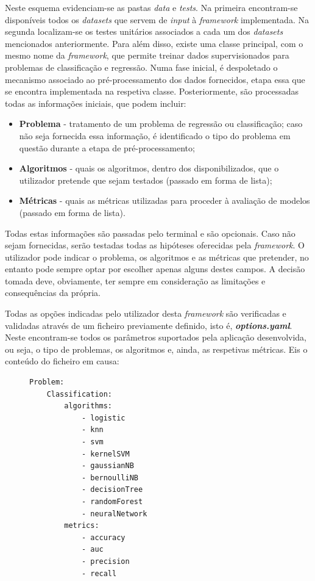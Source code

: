 \documentclass[a4paper]{report}
\begin{document}
{	Neste esquema evidenciam-se as pastas \textsl{data} e \textsl{tests}.
	Na primeira encontram-se disponíveis todos os \textit{datasets} que servem de \textit{input} à \textit{framework} implementada.
	Na segunda localizam-se os testes unitários associados a cada um dos \textit{datasets} mencionados anteriormente.
	Para além disso, existe uma classe principal, com o mesmo nome da \textit{framework}, que permite treinar dados supervisionados para problemas de classificação e regressão.
	Numa fase inicial, é despoletado o mecanismo associado ao pré-processamento dos dados fornecidos, etapa essa que se encontra implementada na respetiva classe.
	Posteriormente, são processadas todas as informações iniciais, que podem incluir:
	\begin{itemize}
		\item \textbf{Problema} - tratamento de um problema de regressão ou classificação; caso não seja fornecida essa informação, é identificado o tipo do problema em questão durante a etapa de pré-processamento;
		\item \textbf{Algoritmos} - quais os algoritmos, dentro dos disponibilizados, que o utilizador pretende que sejam testados (passado em forma de lista);
		\item \textbf{Métricas} - quais as métricas utilizadas para proceder à avaliação de modelos (passado em forma de lista).
	\end{itemize}

	Todas estas informações são passadas pelo terminal e são opcionais. Caso não sejam fornecidas, serão testadas todas as hipóteses oferecidas pela \textit{framework}.
    O utilizador pode indicar o problema, os algoritmos e as métricas que pretender, no entanto pode sempre optar por escolher apenas alguns destes campos.
    A decisão tomada deve, obviamente, ter sempre em consideração as limitações e consequências da própria.
    
    Todas as opções indicadas pelo utilizador desta \textit{framework} são verificadas e validadas através de um ficheiro previamente definido, isto é, \textbf{\textsl{options.yaml}}.
	Neste encontram-se todos os parâmetros suportados pela aplicação desenvolvida, ou seja, o tipo de problemas, os algoritmos e, ainda, as respetivas métricas.
	Eis o conteúdo do ficheiro em causa:
    \begin{figure}[H]
        \centering
        \begin{verbatim}
Problem:
    Classification:
        algorithms:
            - logistic
            - knn
            - svm
            - kernelSVM
            - gaussianNB
            - bernoulliNB
            - decisionTree
            - randomForest
            - neuralNetwork
        metrics:
            - accuracy
            - auc
            - precision
            - recall


\end{verbatim}
\end{figure}}
\end{document}
